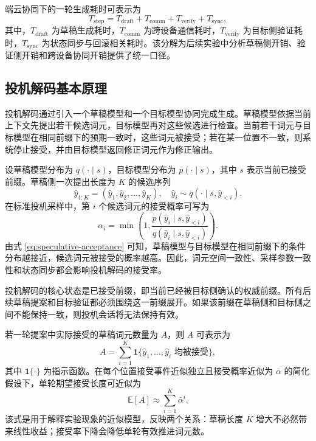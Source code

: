 端云协同下的一轮生成耗时可表示为
\begin{equation}
  T_{\mathrm{step}}
  = T_{\mathrm{draft}} + T_{\mathrm{comm}} + T_{\mathrm{verify}} + T_{\mathrm{sync}},
  \label{eq:collaborative-latency}
\end{equation}
其中，$T_{\mathrm{draft}}$ 为草稿生成耗时，$T_{\mathrm{comm}}$ 为跨设备通信耗时，$T_{\mathrm{verify}}$ 为目标侧验证耗时，$T_{\mathrm{sync}}$ 为状态同步与回滚相关耗时。该分解为后续实验中分析草稿侧开销、验证侧开销和跨设备协同开销提供了统一口径。

\subsection{投机解码基本原理}

投机解码通过引入一个草稿模型和一个目标模型协同完成生成。草稿模型依据当前上下文先提出若干候选词元，目标模型再对这些候选进行检查\cite{leviathan2023speculative,chen2023speculative}。当前若干词元与目标模型在相同前缀下的预期一致时，这些词元被接受；若在某一位置不一致，则系统停止接受，并由目标模型返回修正词元作为修正输出。

设草稿模型分布为 $q(\cdot \mid s)$，目标模型分布为 $p(\cdot \mid s)$，其中 $s$ 表示当前已接受前缀。草稿侧一次提出长度为 $K$ 的候选序列
\begin{equation}
  \hat{y}_{1:K}=(\hat{y}_1,\hat{y}_2,\ldots,\hat{y}_K),
  \quad
  \hat{y}_i \sim q(\cdot \mid s,\hat{y}_{<i}).
  \label{eq:draft-proposal}
\end{equation}
在标准投机采样中，第 $i$ 个候选词元的接受概率可写为
\begin{equation}
  \alpha_i
  =
  \min\left(
    1,
    \frac{p(\hat{y}_i \mid s,\hat{y}_{<i})}
         {q(\hat{y}_i \mid s,\hat{y}_{<i})}
  \right).
  \label{eq:speculative-acceptance}
\end{equation}
由式 \eqref{eq:speculative-acceptance} 可知，草稿模型与目标模型在相同前缀下的条件分布越接近，候选词元被接受的概率越高。因此，词元空间一致性、采样参数一致性和状态同步都会影响投机解码的接受率。

投机解码的核心状态是已接受前缀，即当前已经被目标侧确认的权威前缀。所有后续草稿提案和目标验证都必须围绕这一前缀展开。如果该前缀在草稿侧和目标侧之间不能保持一致，则投机会话将无法保持有效。

若一轮提案中实际接受的草稿词元数量为 $A$，则 $A$ 可表示为
\begin{equation}
  A = \sum_{i=1}^{K}
      \mathbf{1}\{\hat{y}_1,\ldots,\hat{y}_i \text{ 均被接受}\},
  \label{eq:accepted-count}
\end{equation}
其中 $\mathbf{1}\{\cdot\}$ 为指示函数。在每个位置接受事件近似独立且接受概率近似为 $\bar{\alpha}$ 的简化假设下，单轮期望接受长度可近似为
\begin{equation}
  \mathbb{E}[A]
  \approx
  \sum_{i=1}^{K} \bar{\alpha}^{i}.
  \label{eq:expected-accepted-length}
\end{equation}
该式是用于解释实验现象的近似模型，反映两个关系：草稿长度 $K$ 增大不必然带来线性收益；接受率下降会降低单轮有效推进词元数。

